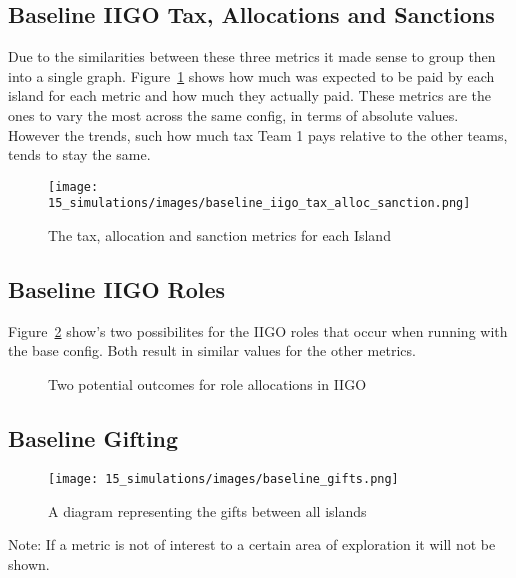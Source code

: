 \subsection{Baseline IIGO Tax, Allocations and Sanctions}
\label{subsec:Simulations:baseline:IIGO}

Due to the similarities between these three metrics it made sense to group then into a single graph. Figure~\ref{fig:Simulations:IIGO_numbers} shows how much was expected to be paid by each island for each metric and how much they actually paid. These metrics are the ones to vary the most across the same config, in terms of absolute values. However the trends, such how much tax Team 1 pays relative to the other teams, tends to stay the same.

\begin{figure}[H] 
    \centering
    \texttt{[image: 15\_simulations/images/baseline\_iigo\_tax\_alloc\_sanction.png]}
    \caption{The tax, allocation and sanction metrics for each Island}
    \label{fig:Simulations:IIGO_numbers}
\end{figure} 
    

\subsection{Baseline IIGO Roles}
\label{subsec:Simulations:baseline:IIGO_roles}

Figure~\ref{fig:Simulations:iigo_roles} show's two possibilites for the IIGO roles that occur when running with the base config. Both result in similar values for the other metrics.

\begin{figure}
    \centering
    \caption{Two potential outcomes for role allocations in IIGO}
    \label{fig:Simulations:iigo_roles}
\end{figure}

\subsection{Baseline Gifting}
\label{subsec:Simulations:baseline:trading}

\begin{figure}[H] 
    \centering
    \texttt{[image: 15\_simulations/images/baseline\_gifts.png]}
    \caption{A diagram representing the gifts between all islands}
    \label{fig:Simulations:IITO_gifts}
\end{figure} 

Note: If a metric is not of interest to a certain area of exploration it will not be shown.